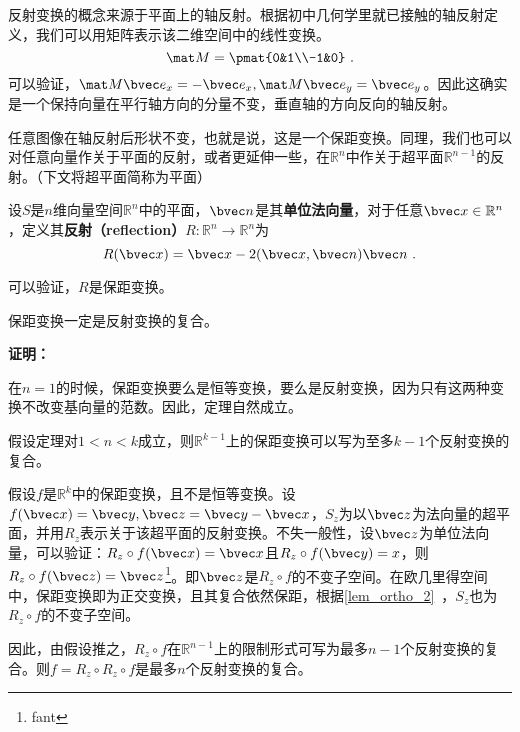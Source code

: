 反射变换的概念来源于平面上的轴反射。根据初中几何学里就已接触的轴反射定义，我们可以用矩阵表示该二维空间中的线性变换。
\begin{equation}
\mat M=\pmat{0&1\\-1&0}~.
\end{equation}
可以验证，$\mat M\bvec e_x=-\bvec e_x,\mat M \bvec e_y=\bvec e_y$。因此这确实是一个保持向量在平行轴方向的分量不变，垂直轴的方向反向的轴反射。

任意图像在轴反射后形状不变，也就是说，这是一个保距变换。同理，我们也可以对任意向量作关于平面的反射，或者更延伸一些，在$\mathbb R^n$中作关于超平面$\mathbb R^{n-1}$的反射。（下文将超平面简称为平面）
\begin{definition}{}
设$S$是$n$维向量空间$\mathbb R^n$中的平面，$\bvec n$是其\textbf{单位法向量}，对于任意$\bvec x\in \mathbb R^n$，定义其\textbf{反射（reflection）}$R:\mathbb R^n\rightarrow \mathbb R^n$为
\begin{equation}
R(\bvec x)=\bvec x-2(\bvec x,\bvec n)\bvec n~.
\end{equation}
\end{definition}
可以验证，$R$是保距变换。


\begin{theorem}{}
保距变换一定是反射变换的复合。
\end{theorem}
\textbf{证明：}

在$n=1$的时候，保距变换要么是恒等变换，要么是反射变换，因为只有这两种变换不改变基向量的范数。因此，定理自然成立。

假设定理对$1<n<k$成立，则$\mathbb R^{k-1}$上的保距变换可以写为至多$k-1$个反射变换的复合。 

假设$f$是$\mathbb R^k$中的保距变换，且不是恒等变换。设$f(\bvec x)=\bvec y,\bvec z=\bvec y-\bvec x$，$S_z$为以$\bvec z$为法向量的超平面，并用$R_z$表示关于该超平面的反射变换。不失一般性，设$\bvec z$为单位法向量，可以验证：$R_z\circ f(\bvec x)=\bvec x$且$R_z\circ f(\bvec y)=x$，则$R_z\circ f(\bvec z)=\bvec z$\footnote{fant}。即$\bvec z$是$R_z\circ f$的不变子空间。在欧几里得空间中，保距变换即为正交变换，且其复合依然保距，根据\autoref{lem_ortho_2}~，$S_z$也为$R_z\circ f$的不变子空间。

因此，由假设推之，$R_z\circ f$在$\mathbb R^{n-1}$上的限制形式可写为最多$n-1$个反射变换的复合。则$f=R_z\circ R_z\circ f$是最多$n$个反射变换的复合。